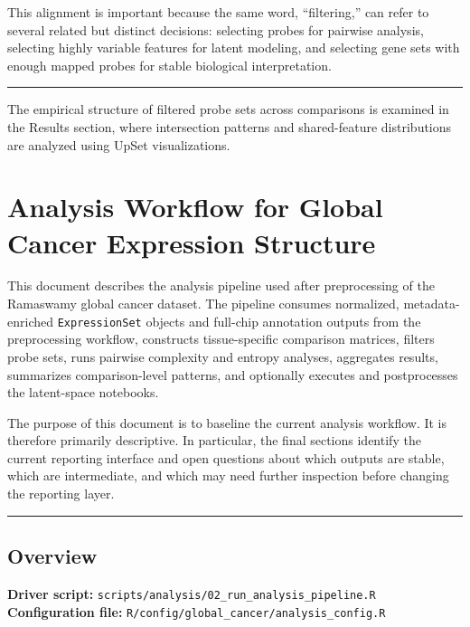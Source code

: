 \documentclass[
  letterpaper,
  DIV=11,
  numbers=noendperiod,
  openany,
  oneside]{scrreprt}
\begin{document}
This alignment is important because the same word, ``filtering,'' can
refer to several related but distinct decisions: selecting probes for
pairwise analysis, selecting highly variable features for latent
modeling, and selecting gene sets with enough mapped probes for stable
biological interpretation.

\begin{center}\rule{0.5\linewidth}{0.5pt}\end{center}

The empirical structure of filtered probe sets across comparisons is
examined in the Results section, where intersection patterns and
shared-feature distributions are analyzed using UpSet visualizations.

\chapter{Analysis Workflow for Global Cancer Expression
Structure}\label{analysis-workflow-for-global-cancer-expression-structure}

This document describes the analysis pipeline used after preprocessing
of the Ramaswamy global cancer dataset. The pipeline consumes
normalized, metadata-enriched \texttt{ExpressionSet} objects and
full-chip annotation outputs from the preprocessing workflow, constructs
tissue-specific comparison matrices, filters probe sets, runs pairwise
complexity and entropy analyses, aggregates results, summarizes
comparison-level patterns, and optionally executes and postprocesses the
latent-space notebooks.

The purpose of this document is to baseline the current analysis
workflow. It is therefore primarily descriptive. In particular, the
final sections identify the current reporting interface and open
questions about which outputs are stable, which are intermediate, and
which may need further inspection before changing the reporting layer.

\begin{center}\rule{0.5\linewidth}{0.5pt}\end{center}

\section*{Overview}\label{overview-4}


\textbf{Driver script:}
\texttt{scripts/analysis/02\_run\_analysis\_pipeline.R}\\
\textbf{Configuration file:}
\texttt{R/config/global\_cancer/analysis\_config.R}
\end{document}
